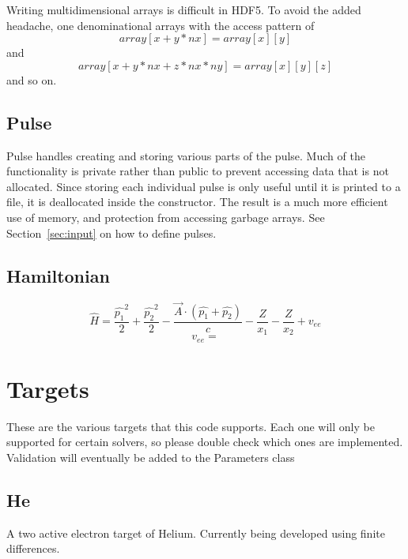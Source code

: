 \documentclass{article}
\begin{document}
Writing multidimensional arrays is difficult in HDF5. To avoid the added headache, one denominational arrays with the access pattern of
\begin{equation}
	array[x+y*nx] = array[x][y]
\end{equation}
and 
\begin{equation}
	array[x+y*nx+z*nx*ny] = array[x][y][z]
\end{equation}
and so on.

\subsection{Pulse} %
\label{sub:pulse}
Pulse handles creating and storing various parts of the pulse. Much of the functionality is private rather than public to prevent accessing data that is not allocated. Since storing each individual pulse is only useful until it is printed to a file, it is deallocated inside the constructor. The result is a much more efficient use of memory, and protection from accessing garbage arrays. See Section~\ref{sec:input} on how to define pulses.

\subsection{Hamiltonian} %
\label{sub:hamiltonian}
\begin{equation}
	\hat H = \frac{\hat{p_1}^2}{2} + \frac{\hat{p_2}^2}{2} - \frac{\vec{A} \cdot (\hat{p_1}+\hat{p_2})}{c} - \frac{Z}{x_1} - \frac{Z}{x_2} + v_{ee}
\end{equation}
\begin{equation}
	v_{ee} = 
\end{equation}


\section{Targets} %
\label{sec:targets}
These are the various targets that this code supports. Each one will only be supported for certain solvers, so please double check which ones are implemented. Validation will eventually be added to the Parameters class
\subsection{He} %
\label{sub:he}
A two active electron target of Helium. Currently being developed using finite differences.
\end{document}
